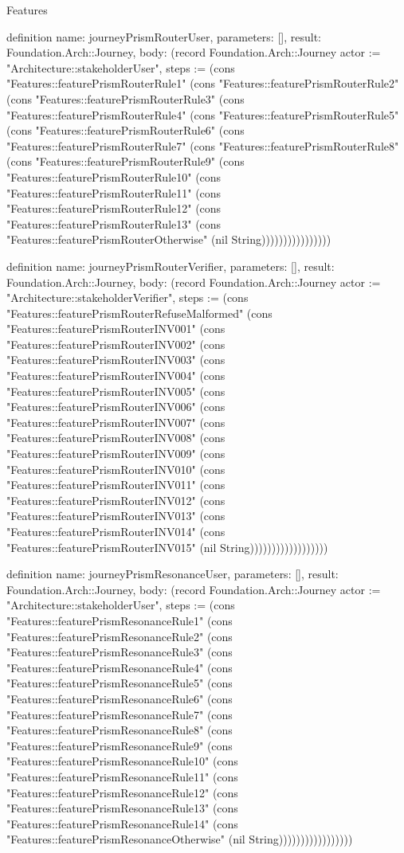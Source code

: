 \begin{lexlean}{Features}
\begin{semanticmodule}
definition{
  name: journeyPrismRouterUser,
  parameters: [],
  result: Foundation.Arch::Journey,
  body: (record Foundation.Arch::Journey {actor := "Architecture::stakeholderUser", steps := (cons "Features::featurePrismRouterRule1" (cons "Features::featurePrismRouterRule2" (cons "Features::featurePrismRouterRule3" (cons "Features::featurePrismRouterRule4" (cons "Features::featurePrismRouterRule5" (cons "Features::featurePrismRouterRule6" (cons "Features::featurePrismRouterRule7" (cons "Features::featurePrismRouterRule8" (cons "Features::featurePrismRouterRule9" (cons "Features::featurePrismRouterRule10" (cons "Features::featurePrismRouterRule11" (cons "Features::featurePrismRouterRule12" (cons "Features::featurePrismRouterRule13" (cons "Features::featurePrismRouterOtherwise" (nil String)))))))))))))))})
}

definition{
  name: journeyPrismRouterVerifier,
  parameters: [],
  result: Foundation.Arch::Journey,
  body: (record Foundation.Arch::Journey {actor := "Architecture::stakeholderVerifier", steps := (cons "Features::featurePrismRouterRefuseMalformed" (cons "Features::featurePrismRouterINV001" (cons "Features::featurePrismRouterINV002" (cons "Features::featurePrismRouterINV003" (cons "Features::featurePrismRouterINV004" (cons "Features::featurePrismRouterINV005" (cons "Features::featurePrismRouterINV006" (cons "Features::featurePrismRouterINV007" (cons "Features::featurePrismRouterINV008" (cons "Features::featurePrismRouterINV009" (cons "Features::featurePrismRouterINV010" (cons "Features::featurePrismRouterINV011" (cons "Features::featurePrismRouterINV012" (cons "Features::featurePrismRouterINV013" (cons "Features::featurePrismRouterINV014" (cons "Features::featurePrismRouterINV015" (nil String)))))))))))))))))})
}

definition{
  name: journeyPrismResonanceUser,
  parameters: [],
  result: Foundation.Arch::Journey,
  body: (record Foundation.Arch::Journey {actor := "Architecture::stakeholderUser", steps := (cons "Features::featurePrismResonanceRule1" (cons "Features::featurePrismResonanceRule2" (cons "Features::featurePrismResonanceRule3" (cons "Features::featurePrismResonanceRule4" (cons "Features::featurePrismResonanceRule5" (cons "Features::featurePrismResonanceRule6" (cons "Features::featurePrismResonanceRule7" (cons "Features::featurePrismResonanceRule8" (cons "Features::featurePrismResonanceRule9" (cons "Features::featurePrismResonanceRule10" (cons "Features::featurePrismResonanceRule11" (cons "Features::featurePrismResonanceRule12" (cons "Features::featurePrismResonanceRule13" (cons "Features::featurePrismResonanceRule14" (cons "Features::featurePrismResonanceOtherwise" (nil String))))))))))))))))})
}


\end{semanticmodule}
\end{lexlean}
